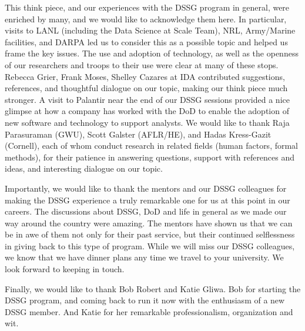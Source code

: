 \documentclass[11pt]{article}
\begin{document}
This think piece, and our experiences with the DSSG program in general, were enriched by many, and we would like to acknowledge them here. In particular, visits to LANL (including the Data Science at Scale Team), NRL, Army/Marine facilities, and DARPA led us to consider this as a possible topic and helped us frame the key issues. The use and adoption of technology, as well as the openness of our researchers and troops to their use were clear at many of these stops. Rebecca Grier, Frank Moses, Shelley Cazares at IDA contributed suggestions, references, and thoughtful dialogue on our topic, making our think piece much stronger. A visit to Palantir near the end of our DSSG sessions provided a nice glimpse at how a company has worked with the DoD to enable the adoption of new software and technology to support analysts. We would like to thank Raja Parasuraman (GWU), Scott Galster (AFLR/HE), and Hadas Kress-Gazit (Cornell), each of whom conduct research in related fields (human factors, formal methods), for their patience in answering questions, support with references and ideas, and interesting dialogue on our topic. 

Importantly, we would like to thank the mentors and our DSSG colleagues for making the DSSG experience a truly remarkable one for us at this point in our careers. The discussions about DSSG, DoD and life in general as we made our way around the country were amazing. The mentors have shown us that we can be in awe of them not only for their past service, but their continued selflessness in giving back to this type of program. While we will miss our DSSG colleagues, we know that we have dinner plans any time we travel to your university. We look forward to keeping in touch. 

Finally, we would like to thank Bob Robert and Katie Gliwa. Bob for starting the DSSG program, and coming back to run it now with the enthusiasm of a new DSSG member. And Katie for her remarkable professionalism, organization and wit. 


\newpage


\normalsize
\end{document}
